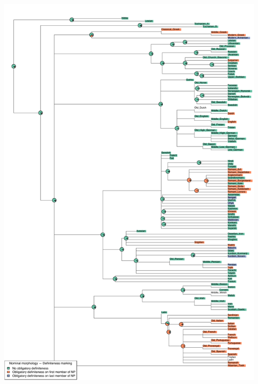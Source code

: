 \includegraphics[width=.9\linewidth]{supp-graphics/NominalmorphologyDefinitenessmarkingDEFFIRSTNominalmorphologyDefinitenessmarkingDEFLAST.pdf}

